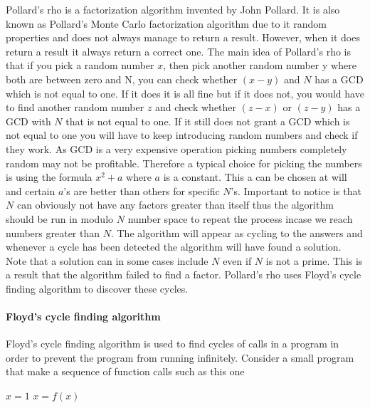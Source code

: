 Pollard’s rho is a factorization algorithm invented by John Pollard. It is also known as Pollard’s Monte Carlo factorization algorithm due to it random properties and does not always manage to return a result. However, when it does return a result it always return a correct one.
The main idea of Pollard’s rho is that if you pick a random number \(x\), then pick another random number y where both are between zero and N, you can check whether \((x-y)\) and \(N\) has a GCD which is not equal to one. If it does it is all fine but if it does not, you would have to find another random number \(z\) and check whether \((z-x)\) or \((z-y)\) has a GCD with \(N\) that is not equal to one. If it still does not grant a GCD which is not equal to one you will have to keep introducing random numbers and check if they work.
As GCD is a very expensive operation picking numbers completely random may not be profitable. Therefore a typical choice for picking the numbers is using the formula \(x^2 + a\) where \(a\) is a constant. This a can be chosen at will and certain \(a\)’s are better than others for specific \(N\)’s.
Important to notice is that \(N\) can obviously not have any factors greater than itself thus the algorithm should be run in modulo \(N\) number space to repeat the process incase we reach numbers greater than \(N\). 
The algorithm will appear as cycling to the answers and whenever a cycle has been detected the algorithm will have found a solution. Note that a solution can in some cases include \(N\) even if \(N\) is not a prime. This is a result that the algorithm failed to find a factor. Pollard’s rho uses Floyd’s cycle finding algorithm to discover these cycles.

\paragraph{Floyd’s cycle finding algorithm}

Floyd’s cycle finding algorithm is used to find cycles of calls in a program in order to prevent the program from running infinitely. Consider a small program that make a sequence of function calls such as this one

\begin{algorithm}
	\begin{algorithmic}
		\State $x = 1$
			\State $x = f(x)$
		\EndWhile	
	\end{algorithmic}
\end{algorithm}

